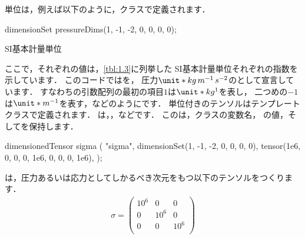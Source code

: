単位は，例えば以下のように，クラスで定義されます．
\begin{OFverbatim}[terminal]
dimensionSet pressureDims(1, -1, -2, 0, 0, 0, 0);
\end{OFverbatim}


\begin{table}[ht]
 
 \caption{SI基本計量単位}
 \label{tbl:1.3}
\end{table}


ここで，それぞれの値は，\autoref{tbl:1.3}に列挙した
SI基本計量単位それぞれの指数を示しています．
このコードではを，
圧力$\unit*{kg\,m^{-1}\,s^{-2}}$のとして宣言しています．
すなわちの引数配列の最初の項目$1$は$\unit*{kg^{1}}$を表し，
二つめの$-1$は$\unit*{m^{-1}}$を表す，などのようにです．
単位付きのテンソルはテンプレートクラスで定義されます．
は，，などです．
このは，クラスの変数名，
の値，そしてを保持します．

\begin{OFverbatim}[terminal]
dimensionedTensor sigma
    (
        "sigma",
        dimensionSet(1, -1, -2, 0, 0, 0, 0),
        tensor(1e6, 0, 0, 0, 1e6, 0, 0, 0, 1e6),
    );
\end{OFverbatim}
は，圧力あるいは応力としてしかるべき次元をもつ以下のテンソルをつくります．
\begin{align}
 \label{eq:1.45}
 \sigma =
 \begin{pmatrix}
  10^{6} & 0 & 0 \\
  0 & 10^{6} & 0 \\
  0 & 0 & 10^{6} \\
 \end{pmatrix}
\end{align}


